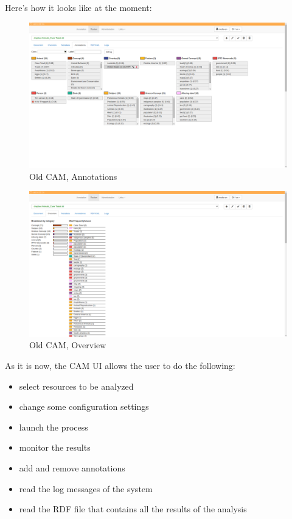 \documentclass[12pt,oneside,svgnames]{memoir}
\begin{document}
Here's how it looks like at the moment:

\begin{figure}[htbp]
\centering
\includegraphics{./src/img/oldCAM-annotations.png}
\caption{Old CAM, Annotations}
\end{figure}

\begin{figure}[htbp]
\centering
\includegraphics{./src/img/oldCAM-overview.png}
\caption{Old CAM, Overview}
\end{figure}

As it is now, the CAM UI allows the user to do the following:

\begin{itemize}
\itemsep1pt\parskip0pt
\item
  select resources to be analyzed
\item
  change some configuration settings
\item
  launch the process
\item
  monitor the results
\item
  add and remove annotations
\item
  read the log messages of the system
\item
  read the RDF file that contains all the results of the analysis
\end{itemize}
\end{document}
